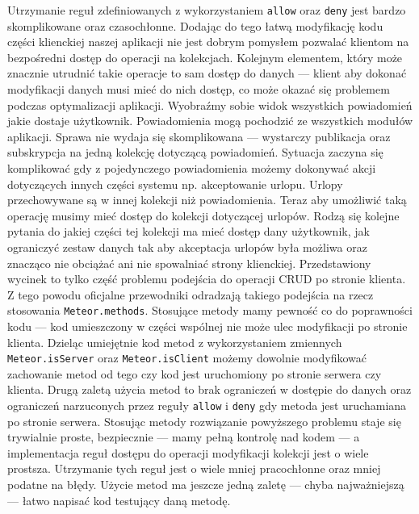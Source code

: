 Utrzymanie reguł zdefiniowanych z wykorzystaniem \verb|allow| oraz \verb|deny| jest bardzo skomplikowane oraz czasochłonne. Dodając do tego łatwą modyfikację kodu części klienckiej naszej aplikacji nie jest dobrym pomysłem pozwalać klientom na bezpośredni dostęp do operacji na kolekcjach. Kolejnym elementem, który może znacznie utrudnić takie operacje to sam dostęp do danych --- klient aby dokonać modyfikacji danych musi mieć do nich dostęp, co może okazać się problemem podczas optymalizacji aplikacji. Wyobraźmy sobie widok wszystkich powiadomień jakie dostaje użytkownik. Powiadomienia mogą pochodzić ze wszystkich modułów aplikacji. Sprawa nie wydaja się skomplikowana --- wystarczy publikacja oraz subskrypcja na jedną kolekcję dotyczącą powiadomień. Sytuacja zaczyna się komplikować gdy z pojedynczego powiadomienia możemy dokonywać akcji dotyczących innych części systemu np. akceptowanie urlopu. Urlopy przechowywane są w innej kolekcji niż powiadomienia. Teraz aby umożliwić taką operację musimy mieć dostęp do kolekcji dotyczącej urlopów. Rodzą się kolejne pytania do jakiej części tej kolekcji ma mieć dostęp dany użytkownik, jak ograniczyć zestaw danych tak aby akceptacja urlopów była możliwa oraz znacząco nie obciążać ani nie spowalniać strony klienckiej. Przedstawiony wycinek to tylko część problemu podejścia do operacji CRUD po stronie klienta. Z tego powodu oficjalne przewodniki odradzają takiego podejścia na rzecz stosowania \verb|Meteor.methods|. Stosujące metody mamy pewność co do poprawności kodu --- kod umieszczony w części wspólnej nie może ulec modyfikacji po stronie klienta. Dzieląc umiejętnie kod metod z wykorzystaniem zmiennych \verb|Meteor.isServer| oraz \verb|Meteor.isClient| możemy dowolnie modyfikować zachowanie metod od tego czy kod jest uruchomiony po stronie serwera czy klienta. Drugą zaletą użycia metod to brak ograniczeń w dostępie do danych oraz ograniczeń narzuconych przez reguły \verb|allow| i \verb|deny| gdy metoda jest uruchamiana po stronie serwera. Stosując metody rozwiązanie powyższego problemu staje się trywialnie proste, bezpiecznie --- mamy pełną kontrolę nad kodem --- a implementacja reguł dostępu do operacji modyfikacji kolekcji jest o wiele prostsza. Utrzymanie tych reguł jest o wiele mniej pracochłonne oraz mniej podatne na błędy. Użycie metod ma jeszcze jedną zaletę --- chyba najważniejszą --- łatwo napisać kod testujący daną metodę.

